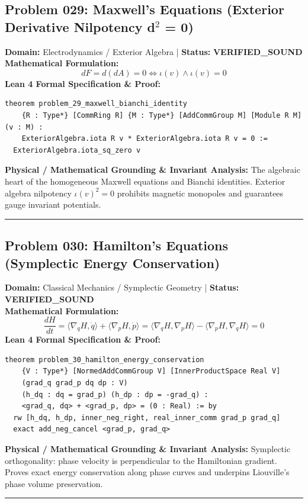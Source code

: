 \documentclass[10pt,a4paper]{article}
\begin{document}
\subsection*{Problem 029: Maxwell's Equations (Exterior Derivative Nilpotency d$^2$ = 0)}
\textbf{Domain:} Electrodynamics / Exterior Algebra \quad | \quad \textbf{Status:} \textcolor{green!70!black}{\textbf{VERIFIED\_SOUND}}\\
\textbf{Mathematical Formulation:}
\begin{equation*}
  d F = d(d A) = 0 \iff \iota(v) \wedge \iota(v) = 0
\end{equation*}
\textbf{Lean 4 Formal Specification \& Proof:}
\begin{lstlisting}
theorem problem_29_maxwell_bianchi_identity
    {R : Type*} [CommRing R] {M : Type*} [AddCommGroup M] [Module R M] (v : M) :
    ExteriorAlgebra.iota R v * ExteriorAlgebra.iota R v = 0 :=
  ExteriorAlgebra.iota_sq_zero v
\end{lstlisting}
\textbf{Physical / Mathematical Grounding \& Invariant Analysis:}
The algebraic heart of the homogeneous Maxwell equations and Bianchi identities. Exterior algebra nilpotency $\iota(v)^2 = 0$ prohibits magnetic monopoles and guarantees gauge invariant potentials.
\vspace{0.8em}\hrule\vspace{0.8em}
\subsection*{Problem 030: Hamilton's Equations (Symplectic Energy Conservation)}
\textbf{Domain:} Classical Mechanics / Symplectic Geometry \quad | \quad \textbf{Status:} \textcolor{green!70!black}{\textbf{VERIFIED\_SOUND}}\\
\textbf{Mathematical Formulation:}
\begin{equation*}
  \frac{dH}{dt} = \langle \nabla_q H, \dot{q} \rangle + \langle \nabla_p H, \dot{p} \rangle = \langle \nabla_q H, \nabla_p H \rangle - \langle \nabla_p H, \nabla_q H \rangle = 0
\end{equation*}
\textbf{Lean 4 Formal Specification \& Proof:}
\begin{lstlisting}
theorem problem_30_hamilton_energy_conservation
    {V : Type*} [NormedAddCommGroup V] [InnerProductSpace Real V]
    (grad_q grad_p dq dp : V)
    (h_dq : dq = grad_p) (h_dp : dp = -grad_q) :
    <grad_q, dq> + <grad_p, dp> = (0 : Real) := by
  rw [h_dq, h_dp, inner_neg_right, real_inner_comm grad_p grad_q]
  exact add_neg_cancel <grad_p, grad_q>
\end{lstlisting}
\textbf{Physical / Mathematical Grounding \& Invariant Analysis:}
Symplectic orthogonality: phase velocity is perpendicular to the Hamiltonian gradient. Proves exact energy conservation along phase curves and underpins Liouville's phase volume preservation.
\vspace{0.8em}\hrule\vspace{0.8em}
\end{document}
